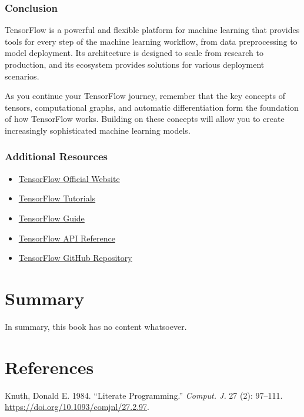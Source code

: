 \documentclass[
  letterpaper,
  DIV=11,
  numbers=noendperiod]{scrreprt}
\providecommand{\tightlist}{%
  \setlength{\itemsep}{0pt}\setlength{\parskip}{0pt}}\usepackage{longtable,booktabs,array}
\newlength{\cslhangindent}
\newenvironment{CSLReferences}[2] %
 {\begin{list}{}{%
  \setlength{\itemindent}{0pt}
  \setlength{\leftmargin}{0pt}
  \setlength{\parsep}{0pt}
  \ifodd #1
   \setlength{\leftmargin}{\cslhangindent}
   \setlength{\itemindent}{-1\cslhangindent}
  \fi
  \setlength{\itemsep}{#2\baselineskip}}}
 {\end{list}}
\begin{document}
\subsection{Conclusion}\label{conclusion-7}

TensorFlow is a powerful and flexible platform for machine learning that
provides tools for every step of the machine learning workflow, from
data preprocessing to model deployment. Its architecture is designed to
scale from research to production, and its ecosystem provides solutions
for various deployment scenarios.

As you continue your TensorFlow journey, remember that the key concepts
of tensors, computational graphs, and automatic differentiation form the
foundation of how TensorFlow works. Building on these concepts will
allow you to create increasingly sophisticated machine learning models.

\subsection{Additional Resources}\label{additional-resources}

\begin{itemize}
\tightlist
\item
  \href{https://www.tensorflow.org/}{TensorFlow Official Website}
\item
  \href{https://www.tensorflow.org/tutorials}{TensorFlow Tutorials}
\item
  \href{https://www.tensorflow.org/guide}{TensorFlow Guide}
\item
  \href{https://www.tensorflow.org/api_docs}{TensorFlow API Reference}
\item
  \href{https://github.com/tensorflow/tensorflow}{TensorFlow GitHub
  Repository}
\end{itemize}


\chapter{Summary}\label{summary-1}

In summary, this book has no content whatsoever.


\chapter*{References}\label{references-2}


\label{refs}
\begin{CSLReferences}{1}{0}
Knuth, Donald E. 1984. {``Literate Programming.''} \emph{Comput. J.} 27
(2): 97--111. \url{https://doi.org/10.1093/comjnl/27.2.97}.

\end{CSLReferences}
\end{document}
